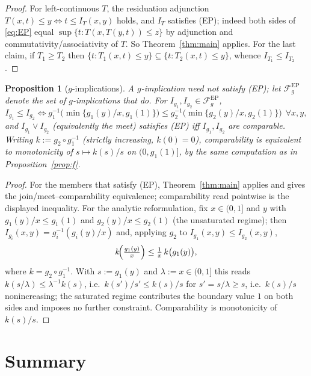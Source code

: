 \documentclass{amsart}
\theoremstyle{plain}
\newtheorem{proposition}{Proposition}
\theoremstyle{definition}
\newcommand{\Fcal}{\mathcal{F}}
\begin{document}
\begin{proof}
For left-continuous $T$, the residuation adjunction $T(x,t)\le y\iff t\le I_T(x,y)$ holds,
and $I_T$ satisfies (EP); indeed both sides of \eqref{eq:EP} equal
$\sup\{t:T(x,T(y,t))\le z\}$ by adjunction and commutativity/associativity of $T$. So
Theorem~\ref{thm:main} applies. For the last claim, if $T_1\ge T_2$ then
$\{t:T_1(x,t)\le y\}\subseteq\{t:T_2(x,t)\le y\}$, whence $I_{T_1}\le I_{T_2}$.
\end{proof}

\begin{proposition}[$g$-implications]\label{prop:g}
A $g$-implication need not satisfy \textup{(EP)}; let
$\Fcal_g^{\mathrm{EP}}$ denote the set of $g$-implications that do. For
$I_{g_1},I_{g_2}\in\Fcal_g^{\mathrm{EP}}$,
\[
I_{g_1}\le I_{g_2}\iff
g_1^{-1}\!\bigl(\min\{g_1(y)/x,g_1(1)\}\bigr)\le
g_2^{-1}\!\bigl(\min\{g_2(y)/x,g_2(1)\}\bigr)\ \ \forall x,y,
\]
and $I_{g_1}\vee I_{g_2}$ (equivalently the meet) satisfies \textup{(EP)} iff
$I_{g_1},I_{g_2}$ are comparable. Writing $k:=g_2\circ g_1^{-1}$ (strictly increasing,
$k(0)=0$), comparability is equivalent to monotonicity of $s\mapsto k(s)/s$ on
$(0,g_1(1)]$, by the same computation as in Proposition~\ref{prop:f}.
\end{proposition}

\begin{proof}
For the members that satisfy (EP), Theorem~\ref{thm:main} applies and gives the
join/meet--comparability equivalence; comparability read pointwise is the displayed
inequality. For the analytic reformulation, fix $x\in(0,1]$ and $y$ with
$g_1(y)/x\le g_1(1)$ and $g_2(y)/x\le g_2(1)$ (the unsaturated regime); then
$I_{g_i}(x,y)=g_i^{-1}(g_i(y)/x)$ and, applying $g_2$ to $I_{g_1}(x,y)\le I_{g_2}(x,y)$,
\[
k\!\Bigl(\tfrac{g_1(y)}{x}\Bigr)\le \tfrac{1}{x}\,k\bigl(g_1(y)\bigr),
\]
where $k=g_2\circ g_1^{-1}$. With $s:=g_1(y)$ and $\lambda:=x\in(0,1]$ this reads
$k(s/\lambda)\le\lambda^{-1}k(s)$, i.e.\ $k(s')/s'\le k(s)/s$ for $s'=s/\lambda\ge s$,
i.e.\ $k(s)/s$ nonincreasing; the saturated regime contributes the boundary value $1$ on
both sides and imposes no further constraint. Comparability is monotonicity of $k(s)/s$.
\end{proof}

\section{Summary}
\end{document}
